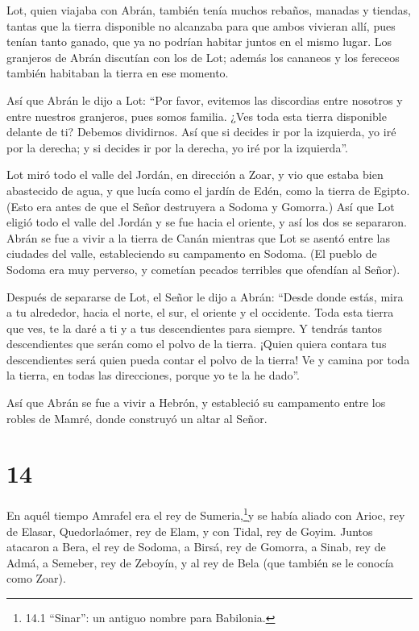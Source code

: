  Lot, quien viajaba con Abrán, también tenía muchos rebaños,
manadas y tiendas,  tantas que la tierra disponible no
alcanzaba para que ambos vivieran allí, pues tenían tanto ganado, que ya
no podrían habitar juntos en el mismo lugar.  Los granjeros
de Abrán discutían con los de Lot; además los cananeos y los fereceos
también habitaban la tierra en ese momento.

 Así que Abrán le dijo a Lot: ``Por favor, evitemos las
discordias entre nosotros y entre nuestros granjeros, pues somos
familia.  ¿Ves toda esta tierra disponible delante de ti?
Debemos dividirnos. Así que si decides ir por la izquierda, yo iré por
la derecha; y si decides ir por la derecha, yo iré por la izquierda''.

 Lot miró todo el valle del Jordán, en dirección a Zoar, y
vio que estaba bien abastecido de agua, y que lucía como el jardín de
Edén, como la tierra de Egipto. (Esto era antes de que el Señor
destruyera a Sodoma y Gomorra.)  Así que Lot eligió todo el
valle del Jordán y se fue hacia el oriente, y así los dos se separaron.
 Abrán se fue a vivir a la tierra de Canán mientras que Lot
se asentó entre las ciudades del valle, estableciendo su campamento en
Sodoma.  (El pueblo de Sodoma era muy perverso, y cometían
pecados terribles que ofendían al Señor).

 Después de separarse de Lot, el Señor le dijo a Abrán:
``Desde donde estás, mira a tu alrededor, hacia el norte, el sur, el
oriente y el occidente.  Toda esta tierra que ves, te la
daré a ti y a tus descendientes para siempre.  Y tendrás
tantos descendientes que serán como el polvo de la tierra. ¡Quien quiera
contara tus descendientes será quien pueda contar el polvo de la tierra!
 Ve y camina por toda la tierra, en todas las direcciones,
porque yo te la he dado''.

 Así que Abrán se fue a vivir a Hebrón, y estableció su
campamento entre los robles de Mamré, donde construyó un altar al Señor.

\hypertarget{section-13}{%
\section{14}\label{section-13}}

 En aquél tiempo Amrafel era el rey de Sumeria,\footnote{14.1
  ``Sinar'': un antiguo nombre para Babilonia.}y se había aliado con
Arioc, rey de Elasar, Quedorlaómer, rey de Elam, y con Tidal, rey de
Goyim.  Juntos atacaron a Bera, el rey de Sodoma, a Birsá,
rey de Gomorra, a Sinab, rey de Admá, a Semeber, rey de Zeboyín, y al
rey de Bela (que también se le conocía como Zoar).

